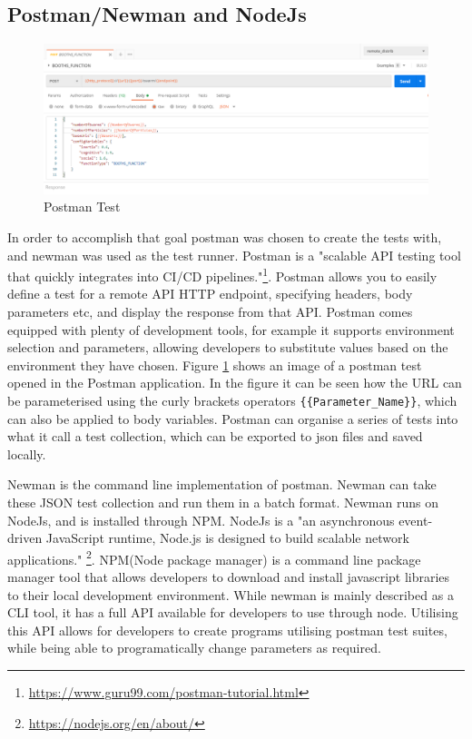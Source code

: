 \documentclass[oneside,12pt]{book}
\begin{document}
\subsection{Postman/Newman and NodeJs}
\begin{figure}[H]
    \centering
    \includegraphics[scale=0.5]{Images/PostmanTest.png}
    \caption{Postman Test}
    \label{fig:PostmanTest}
\end{figure}
In order to accomplish that goal postman was chosen to create the tests with, and newman was used as the test runner. Postman is a "scalable API testing tool that quickly integrates into CI/CD pipelines."\footnote{\url{https://www.guru99.com/postman-tutorial.html}}. Postman allows you to easily define a test for a remote API HTTP endpoint, specifying headers, body parameters etc, and display the response from that API. Postman comes equipped with plenty of development tools, for example it supports environment selection and parameters, allowing developers to substitute values based on the environment they have chosen. Figure \ref{fig:PostmanTest} shows an image of a postman test opened in the Postman application. In the figure it can be seen how the URL can be parameterised using the curly brackets operators \verb|{{Parameter_Name}}|, which can also be applied to body variables.  Postman can organise a series of tests into what it call a test collection, which can be exported to json files and saved locally. 


Newman is the command line implementation of postman. Newman can take these JSON test collection and run them in a batch format. Newman runs on NodeJs, and is installed through NPM. NodeJs is a "an asynchronous event-driven JavaScript runtime, Node.js is designed to build scalable network applications." \footnote{\url{https://nodejs.org/en/about/}}. NPM(Node package manager) is a command line package manager tool that allows developers to download and install javascript libraries to their local development environment. While newman is mainly described as a CLI tool, it has a full API available for developers to use through node. Utilising this API allows for developers to create programs utilising postman test suites, while being able to programatically change parameters as required. 
\end{document}
